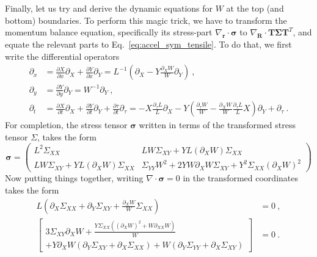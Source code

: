 \documentclass[12pt,a4paper]{article}
\begin{document}
Finally, let us try and derive the dynamic equations for $W$ at the top (and bottom) boundaries. To perform this magic trick, we have to transform the momentum balance equation, specifically its stress-part $\nabla_{\bm{r}}\cdot\bm{\sigma}$ to $\nabla_{\bm{R}}\cdot\bm{T}\bm{\Sigma}\bm{T}^{T}$, and equate the relevant parts to Eq.~\eqref{eq:accel_sym_tensile}. To do that, we first write the differential operators
\begin{equation}\label{eq:derivatives_sym_tensile}
  \begin{split}
  \partial_x &= \frac{\partial X}{\partial x}\partial_X + \frac{\partial Y}{\partial x}\partial_Y = L^{-1}\left(\partial_X - Y\frac{\partial_X W}{W} \partial_Y\right)  \ ,\\
  \partial_y &= \frac{\partial Y}{\partial y}\partial_Y = W^{-1} \partial_Y \ , \\
  \partial_{t} & = \frac{\partial X}{\partial t}\partial_X + \frac{\partial Y}{\partial t}\partial_Y + \frac{\partial \tau}{\partial t}\partial_\tau  = -X\frac{\partial_{\tau} L}{L} \partial_X -Y\left(\frac{\partial_{\tau} W}{W} - \frac{\partial_X W}{W}\frac{\partial_{\tau}L}{L}X\right)\partial_Y + \partial_{\tau} \ .
    \end{split}
\end{equation}
For completion, the stress tensor $\bm{\sigma}$ written in terms of the transformed stress tensor $\Sigma$, takes the form
\begin{equation}\label{eq:stress_transformed_sym_tensile}
  \bm{\sigma} = \left(\begin{array}{cc}
                  L^2 \Sigma_{XX} & L W \Sigma_{XY} + Y L \left(\partial_X W\right) \Sigma_{XX} \\
                  L W \Sigma_{XY} + Y L \left(\partial_X W\right) \Sigma_{XX} & \Sigma_{YY} W^2 + 2 Y W \partial_X W \Sigma_{XY} +Y^2 \Sigma_{XX}\left(\partial_X W\right)^2
                \end{array}\right)
\end{equation}
Now putting things together, writing $\nabla\cdot\bm{\sigma}=0$ in the transformed coordinates takes the form
\begin{equation}\label{eq:div_stress_sym_tensile}
  \begin{split}
    L\left(\partial_X\Sigma_{XX} + \partial_Y\Sigma_{XY} + \frac{\partial_X W}{W} \Sigma_{XX}\right) & = 0 \ , \\
    \left[\begin{split}
      3 \Sigma_{XY} \partial_X W + \frac{Y \Sigma_{XX} \left(\left(\partial_X W\right)^2 + W \partial_{XX} W\right)}{W} \\
      + Y \partial_X W \left(\partial_Y \Sigma_{XY} + \partial_X\Sigma_{XX}\right) + W \left(\partial_Y\Sigma_{YY} + \partial_X\Sigma_{XY}\right)\end{split}\right]  & = 0 \ .
      \end{split}
\end{equation}
\end{document}
